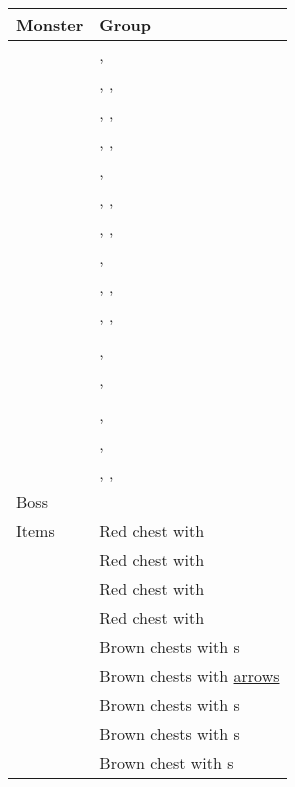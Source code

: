 \noindent\begin{tabularx}{\textwidth}[l]{lX}
	Monster & Group
\\ \hline
	\nameref{monster:desert_hag}
	& \nameref{monster:desert_hag}, \nameref{monster:desert_hag} \\
	& \nameref{monster:desert_hag}, \nameref{monster:desert_hag}, \nameref{monster:desert_hag}
\\ \hline
	\nameref{monster:lamia}
	& \nameref{monster:lamia}, \nameref{monster:lamia}, \nameref{monster:desert_hag} \\
	& \nameref{monster:lamia}, \nameref{monster:lamia}, \nameref{monster:lamia}
\\ \hline
	\nameref{monster:mage}
	& \nameref{monster:mage}, \nameref{monster:mage} \\
	& \nameref{monster:mage}, \nameref{monster:mage}, \nameref{monster:lamia} \\
	& \nameref{monster:mage}, \nameref{monster:mage}, \nameref{monster:mage}
\\ \hline
	\nameref{monster:stoney_roost}
	& \nameref{monster:stoney_roost}, \nameref{monster:stoney_roost} \\
	& \nameref{monster:stoney_roost}, \nameref{monster:stoney_roost}, \nameref{monster:mage} \\
	& \nameref{monster:stoney_roost}, \nameref{monster:stoney_roost}, \nameref{monster:stoney_roost}
\\ \hline
	\nameref{monster:phanquid}
	& \nameref{monster:phanquid} \\
	& \nameref{monster:phanquid}, \nameref{monster:sphinx}
\\ \hline
	\nameref{monster:gather}
	& \nameref{monster:gather}, \nameref{monster:gather}
\\ \hline
	\nameref{monster:freezer_crab}
	& \nameref{monster:freezer_crab} \\
	& \nameref{monster:freezer_crab}, \nameref{monster:gather}
\\ \hline
	\nameref{monster:sphinx}
	& \nameref{monster:sphinx}, \nameref{monster:sphinx} \\
	& \nameref{monster:sphinx}, \nameref{monster:sphinx}, \nameref{monster:gather}
\\ \hline
	Boss & \nameref{monster:ice_golem}
\\ \hline
	Items
	& Red chest with \nameref{item:magic_mirror} \\
	& Red chest with \nameref{armor:noble_armor} \\
	& Red chest with \nameref{weapon:knights_sword} \\
	& Red chest with \nameref{item:river_coin} \\
	& Brown chests with \nameref{weapon:bomb}s \\
	& Brown chests with \hyperref[weapon:bow_of_grace]{arrows} \\
	& Brown chests with \nameref{item:heal_potion}s \\
	& Brown chests with \nameref{item:cure_potion}s \\
	& Brown chest with \nameref{item:refresher}s
\end{tabularx}
